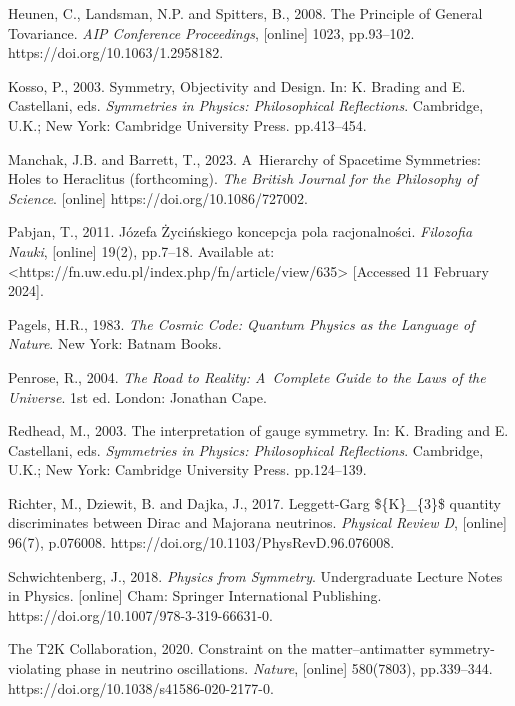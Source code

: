 Heunen, C., Landsman, N.P. and Spitters, B., 2008. The Principle of General Tovariance. \textit{AIP Conference Proceedings}, [online] 1023, pp.93–102. https://doi.org/10.1063/1.2958182.



Kosso, P., 2003. Symmetry, Objectivity and Design. In: K. Brading and E. Castellani, eds. \textit{Symmetries in Physics: Philosophical Reflections}. Cambridge, U.K.; New York: Cambridge University Press. pp.413–454.



Manchak, J.B. and Barrett, T., 2023. A~Hierarchy of Spacetime Symmetries: Holes to Heraclitus (forthcoming). \textit{The British Journal for the Philosophy of Science}. [online] https://doi.org/10.1086/727002.



Pabjan, T., 2011. Józefa Życińskiego koncepcja pola racjonalności. \textit{Filozofia Nauki}, [online] 19(2), pp.7–18. Available at: {\textless}https://fn.uw.edu.pl/index.php/fn/article/view/635{\textgreater} [Accessed 11 February 2024].



Pagels, H.R., 1983. \textit{The Cosmic Code: Quantum Physics as the Language of Nature}. New York: Batnam Books.



Penrose, R., 2004. \textit{The Road to Reality: A~Complete Guide to the Laws of the Universe}. 1st ed. London: Jonathan Cape.



Redhead, M., 2003. The interpretation of gauge symmetry. In: K. Brading and E. Castellani, eds. \textit{Symmetries in Physics: Philosophical Reflections}. Cambridge, U.K.; New York: Cambridge University Press. pp.124–139.



Richter, M., Dziewit, B. and Dajka, J., 2017. Leggett-Garg \$\{K\}\_\{3\}\$ quantity discriminates between Dirac and Majorana neutrinos. \textit{Physical Review D}, [online] 96(7), p.076008. https://doi.org/10.1103/PhysRevD.96.076008.



Schwichtenberg, J., 2018. \textit{Physics from Symmetry}. Undergraduate Lecture Notes in Physics. [online] Cham: Springer International Publishing. https://doi.org/10.1007/978-3-319-66631-0.



The T2K Collaboration, 2020. Constraint on the matter–antimatter symmetry-violating phase in neutrino oscillations. \textit{Nature}, [online] 580(7803), pp.339–344. https://doi.org/10.1038/s41586-020-2177-0.




